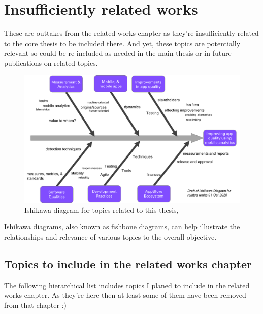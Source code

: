 \chapter{Insufficiently related works}
These are outtakes from the related works chapter as they're insufficiently related to the core thesis to be included there. And yet, these topics are potentially relevant so could be re-included as needed in the main thesis or in future publications on related topics.

\begin{figure}
    \centering
    \includegraphics[width=\linewidth]{images/related-works-ishikawa-diagram-01-oct-2020.png}
    \caption{Ishikawa diagram for topics related to this thesis, }
    \label{fig:related_works_ishikawa_diagram}
\end{figure}


Ishikawa diagrams, also known as fishbone diagrams, can help illustrate the relationships and relevance of various topics to the overall objective. 


\section{Topics to include in the related works chapter}
The following hierarchical list includes topics I planed to include in the related works chapter. As they're here then at least some of them have been removed from that chapter :)


